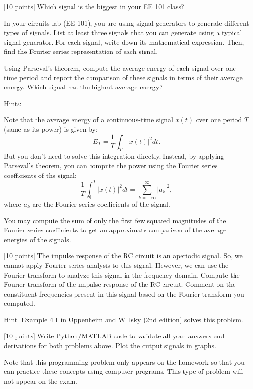 \documentclass{ee102_pset}
\begin{document}
[10 points] Which signal is the biggest in your EE 101 class? 

In your circuits lab (EE 101), you are using signal generators to generate different types of signals. List at least three signals that you can generate using a typical signal generator. For each signal, write down its mathematical expression. Then, find the Fourier series representation of each signal.

Using Parseval's theorem, compute the average energy of each signal over one time period and report the comparison of these signals in terms of their average energy. Which signal has the highest average energy?

{\color{blue}
Hints:

Note that the average energy of a continuous-time signal $x(t)$ over one period $T$ (same as its power) is given by:
\[
E_T = \frac{1}{T} \int_{T} |x(t)|^2 dt.
\]
But you don't need to solve this integration directly. Instead, by applying Parseval's theorem, you can compute the power using the Fourier series coefficients of the signal:
\[
\frac{1}{T} \int_{0}^{T} |x(t)|^2 dt = \sum_{k=-\infty}^{\infty} |a_k|^2,
\]
where $a_k$ are the Fourier series coefficients of the signal.

You may compute the sum of only the first few squared magnitudes of the Fourier series coefficients to get an approximate comparison of the average energies of the signals. 
}

[10 points] The impulse response of the RC circuit is an aperiodic signal. So, we cannot apply Fourier series analysis to this signal. However, we can use the Fourier transform to analyze this signal in the frequency domain. Compute the Fourier transform of the impulse response of the RC circuit. Comment on the constituent frequencies present in this signal based on the Fourier transform you computed.

{\color{blue} Hint: Example 4.1 in Oppenheim and Willsky (2nd edition) solves this problem.}

[10 points] Write Python/MATLAB code to validate all your answers and derivations for both problems above. Plot the output signals in graphs.  

{\color{blue}Note that this programming problem only appears on the homework so that you can practice these concepts using computer programs. This type of problem will not appear on the exam.}
\end{document}
